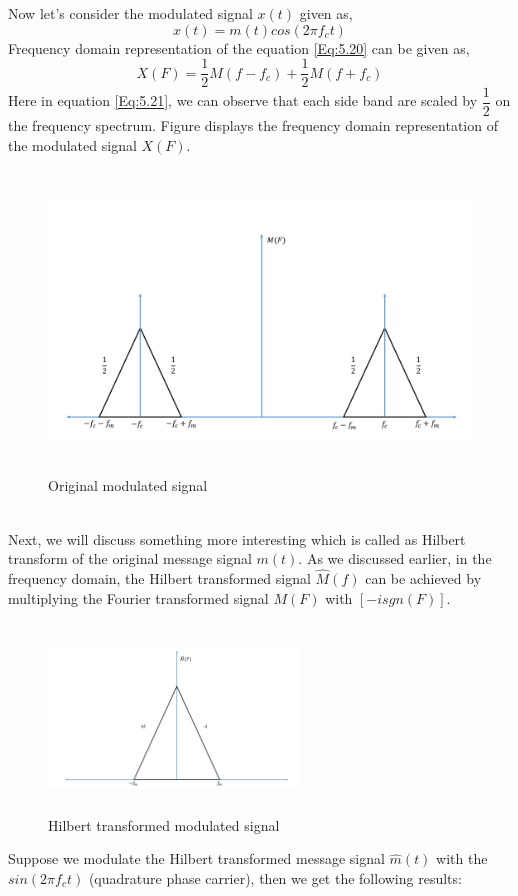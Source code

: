 Now let's consider the modulated signal $x(t)$ given as,
\begin{equation}
x(t)=m(t) cos(2\pi f_c t)
\label{Eq:5.20}
\end{equation}
Frequency domain representation of the equation \ref{Eq:5.20} can be given as,
\begin{equation}
X(F)=\frac{1}{2}M(f-f_c)+\frac{1}{2}M(f+f_c)
\label{Eq:5.21}
\end{equation}
Here in equation \ref{Eq:5.21}, we can observe that each side band are scaled by $\dfrac{1}{2}$ on the frequency spectrum. Figure displays the frequency domain representation of the modulated signal $X(F)$.
\begin{figure}[h]
	\centering
	\includegraphics[width=1.0\textwidth, height=8cm]{./sdf/simplified_coherent_receiver/figures/SSB2.pdf}
	\caption{Original modulated signal}\label{Original_modulated_signal}
\end{figure}\\ 
Next, we will discuss something more interesting which is called as Hilbert transform of the original message signal $m(t)$. As we discussed earlier, in the frequency domain, the Hilbert transformed signal $\hat{M}(f)$ can be achieved by multiplying the Fourier transformed signal $M(F)$ with $[-i sgn(F)]$.
\begin{figure}[h]
	\centering
	\includegraphics[width=0.6\textwidth, height=5cm]{./sdf/simplified_coherent_receiver/figures/SSB3.pdf}
	\caption{Hilbert transformed modulated signal}\label{Hilbert_Transformed_signal}
\end{figure}
Suppose we modulate the Hilbert transformed message signal $\hat{m}(t)$  with the $sin(2\pi f_c t)$ (quadrature phase carrier), then we get the following results:


